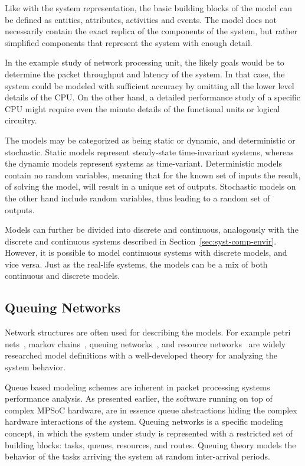 Like with the system representation, the basic building blocks of the model can be defined as entities, attributes, activities and events. The model does not necessarily contain the exact replica of the components of the system, but rather simplified components that represent the system with enough detail.~\cite{Banks:2010:DES}

In the example study of network processing unit, the likely goals would be to determine the packet throughput and latency of the system. In that case, the system could be modeled with sufficient accuracy by omitting all the lower level details of the CPU. On the other hand, a detailed performance study of a specific CPU might require even the minute details of the functional units or logical circuitry.~\cite{Magnusson:2002:Simics, Hughes:2002:Rsim}

The models may be categorized as being static or dynamic, and deterministic or stochastic. Static models represent steady-state time-invariant systems, whereas the dynamic models represent systems as time-variant. Deterministic models contain no random variables, meaning that for the known set of inputs the result, of solving the model, will result in a unique set of outputs. Stochastic models on the other hand include random variables, thus leading to a random set of outputs.~\cite{Banks:2010:DES}

Models can further be divided into discrete and continuous, analogously with the discrete and continuous systems described in Section~\ref{sec:syst-comp-envir}. However, it is possible to model continuous systems with discrete models, and vice versa. Just as the real-life systems, the models can be a mix of both continuous and discrete models.~\cite{Banks:2010:DES}

\subsection{Queuing Networks}
Network structures are often used for describing the models. For example petri nets~\cite{Peterson:1981:Petri}, markov chains~\cite{Bolch:2006:Queuing}, queuing networks~\cite{Bolch:2006:Queuing}, and resource networks~\cite{Menasce:1994:CPP} are widely researched model definitions with a well-developed theory for analyzing the system behavior.

Queue based modeling schemes are inherent in packet processing systems performance analysis. As presented earlier, the software running on top of complex MPSoC hardware, are in essence queue abstractions hiding the complex hardware interactions of the system. Queuing networks is a specific modeling concept, in which the system under study is represented with a restricted set of building blocks: tasks, queues, resources, and routes. Queuing theory models the behavior of the tasks arriving the system at random inter-arrival periods.~\cite{Bolch:2006:Queuing}

